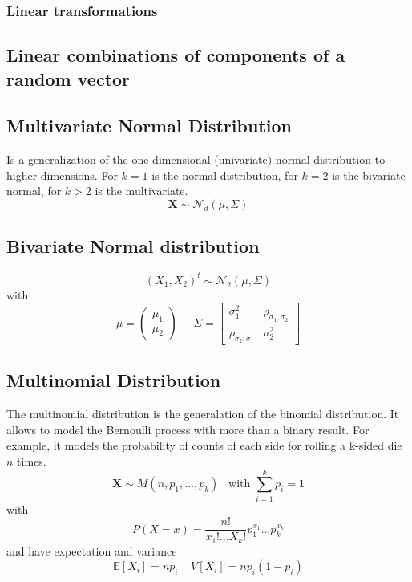 \subsubsection{Linear transformations}

\subsection{Linear combinations of components of a random vector}

\subsection{Multivariate Normal Distribution}
Is a generalization of the one-dimensional (univariate) normal distribution to
higher dimensions. For $k=1$ is the normal distribution, for $k=2$ is the
bivariate normal, for $k>2$ is the multivariate. 
\[ \textbf{X} \sim \mathcal{N}_d(\mu,\Sigma)\]

\subsection{Bivariate Normal distribution}
\[ (X_1,X_2)^t \sim \mathcal{N}_2(\mu,\Sigma) \] with
\[ \mu=\begin{pmatrix}\mu_1\\\mu_2\end{pmatrix}\;\;\;\;\; \Sigma=\begin{bmatrix}
    \sigma_1^2 & \rho_{\sigma_1,\sigma_2}\\
        \rho_{\sigma_2,\sigma_1} & \sigma^2_2
    \end{bmatrix}
\]

\subsection{Multinomial Distribution}
The multinomial distribution is the generalation of the binomial distribution.
It allows to model the Bernoulli process with more than a binary result.  For
example, it models the probability of counts of each side for rolling a k-sided
die $n$ times.
\[ \textbf{X} \sim M(n,p_1,\dots,p_k)\;\;\; \text{with }\sum_{i=1}^k p_i = 1 \]
with
\[ P(X=x) = \frac{n!}{x_1!\dots X_k!}p_1^{x_1}\dots p_k^{x_k} \]
and have expectation and variance
\[ \mathbb{E}[X_i]=np_i \;\;\;\; V[X_i] = np_i(1-p_i) \]

